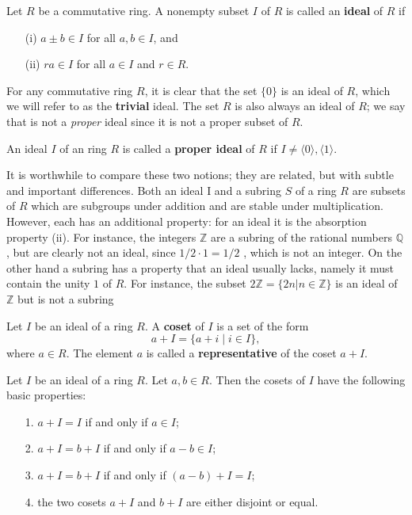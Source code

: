 \documentclass[graybox, reqno]{svmono}
\newcommand{\zz}{\mathbb Z}
\newcommand{\qq}{\mathbb Q}
\begin{document}
\begin{definition} Let $R$ be a commutative ring. A nonempty subset $I$ of $R$ is called an \textup{\textbf{ideal}} of $R$ if
\begin{itemize}
\item[\textup{(i)}] $a \pm b \in I$ for all $a, b \in I$, and
\item[\textup{(ii)}]$ra \in I$ for all $a \in I$ and $r \in R$. 
\end{itemize}
\end{definition}
\begin{remark} \textup{ For any commutative ring $R$, it is clear that the set $\{ 0 \}$ is an ideal of $R$, which we will refer to as the \textup{\textbf{trivial}} ideal. The set $R$ is also always an ideal of $R$; we say that is not a \textit{proper} ideal since it is not a proper subset of $R$. }
\end{remark} 
\begin{definition} An ideal $I$ of an ring $R$ is called a
\textup{\textbf{proper ideal}} of $R$ if $I \neq \langle 0 \rangle, \langle 1 \rangle$. 
\end{definition} 
\begin{remark} It is worthwhile to compare these two notions;
they are related, but with subtle and important differences. Both an ideal I and
a subring $S$ of a ring $R$ are subsets of $R$ which are subgroups under addition and
are stable under multiplication. However, each has an additional property: for an
ideal it is the absorption property (ii). For instance, the integers $\zz$ are a subring
of the rational numbers $\qq$, but are clearly not an ideal, since $1/2 · 1 = 1/2$ , which is not an integer. On the other hand a subring has a property that an ideal usually lacks, namely it must contain the unity $1$ of $R$. For instance, the subset $2\zz = \{ 2n | n \in \zz \}$ is an ideal of $\zz$ but is not a subring
\end{remark} 
\begin{definition} Let $I$ be an ideal of a ring $R$. A \textup{\textbf{coset}} of $I$ is a set of the form \[a + I = \{ a + i \mid i \in I \}, \] where $a \in R$. The element $a$ is called a \textup{\textbf{representative}} of the coset $a+I$. 
\end{definition} 
\begin{theorem} Let $I$ be an ideal of a ring $R$. Let $a, b \in R$. Then the cosets of $I$ have the following basic properties: 
\begin{itemize}
\item[1. ] $a+ I = I$ if and only if $a \in I$;
\item[2. ] $a+ I= b +I$ if and only if $a-b \in I$;
\item[3. ] $a+ I = b+ I$ if and only if $(a-b)+ I = I$;
\item[4. ] the two cosets $a+I$ and $b+I$ are either disjoint or equal.
\end{itemize}
\end{theorem}
\end{document}
